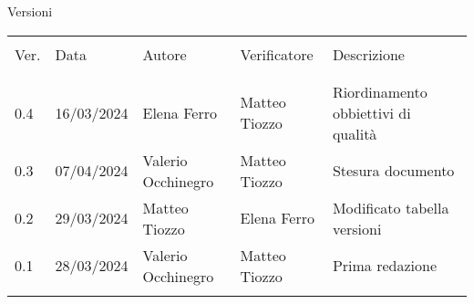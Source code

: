 \documentclass[italian,12pt]{article} %
\begin{document}

\newpage

\captionsetup[table]{list=no}
\begin{table}[!h]
	\begin{center}
		Versioni\\
		\vspace{0.5cm}
		\begin{tabular}{ l l l l l }
			\hline                                                                                       \\[-2ex]
			Ver. & Data       & Autore             & Verificatore  & Descrizione                         \\
			\\[-2ex] \hline \\[-1.5ex]
			0.4  & 16/03/2024 & Elena Ferro        & Matteo Tiozzo & Riordinamento obbiettivi di qualità \\
			0.3  & 07/04/2024 & Valerio Occhinegro & Matteo Tiozzo & Stesura documento                   \\
			0.2  & 29/03/2024 & Matteo Tiozzo      & Elena Ferro   & Modificato tabella versioni         \\
			0.1  & 28/03/2024 & Valerio Occhinegro & Matteo Tiozzo & Prima redazione                     \\
			\\[-1.5ex] \hline
		\end{tabular}
	\end{center}
\end{table}
\captionsetup[table]{list=yes}
\newpage
\tableofcontents
\listoftables
\listoffigures
\newpage





\end{document}
